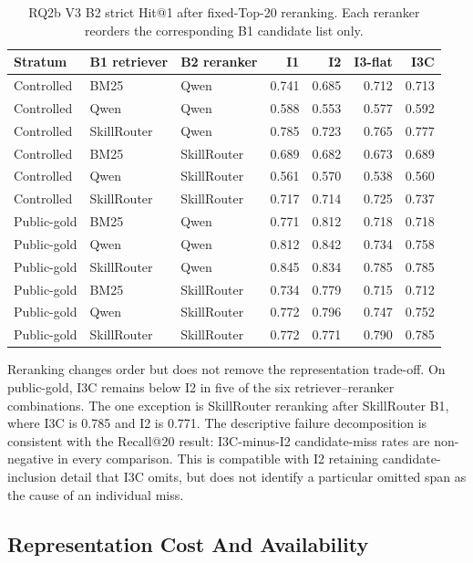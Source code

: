 \begin{table}[H]
\centering
\scriptsize
\setlength{\tabcolsep}{2pt}
\begin{tabular}{lllrrrr}
\toprule
Stratum & B1 retriever & B2 reranker & I1 & I2 & I3-flat & I3C \\
\midrule
Controlled & BM25 & Qwen & 0.741 & 0.685 & 0.712 & 0.713 \\
Controlled & Qwen & Qwen & 0.588 & 0.553 & 0.577 & 0.592 \\
Controlled & SkillRouter & Qwen & 0.785 & 0.723 & 0.765 & 0.777 \\
Controlled & BM25 & SkillRouter & 0.689 & 0.682 & 0.673 & 0.689 \\
Controlled & Qwen & SkillRouter & 0.561 & 0.570 & 0.538 & 0.560 \\
Controlled & SkillRouter & SkillRouter & 0.717 & 0.714 & 0.725 & 0.737 \\
\midrule
Public-gold & BM25 & Qwen & 0.771 & 0.812 & 0.718 & 0.718 \\
Public-gold & Qwen & Qwen & 0.812 & 0.842 & 0.734 & 0.758 \\
Public-gold & SkillRouter & Qwen & 0.845 & 0.834 & 0.785 & 0.785 \\
Public-gold & BM25 & SkillRouter & 0.734 & 0.779 & 0.715 & 0.712 \\
Public-gold & Qwen & SkillRouter & 0.772 & 0.796 & 0.747 & 0.752 \\
Public-gold & SkillRouter & SkillRouter & 0.772 & 0.771 & 0.790 & 0.785 \\
\bottomrule
\end{tabular}
\caption{RQ2b V3 B2 strict Hit@1 after fixed-Top-20 reranking. Each reranker reorders the corresponding B1 candidate list only.}
\label{tab:rq2b-b2-h1}
\end{table}

Reranking changes order but does not remove the representation trade-off. On public-gold, I3C remains below I2 in five of the six retriever--reranker combinations. The one exception is SkillRouter reranking after SkillRouter B1, where I3C is 0.785 and I2 is 0.771. The descriptive failure decomposition is consistent with the Recall@20 result: I3C-minus-I2 candidate-miss rates are non-negative in every comparison. This is compatible with I2 retaining candidate-inclusion detail that I3C omits, but does not identify a particular omitted span as the cause of an individual miss.

\subsection{Representation Cost And Availability}

